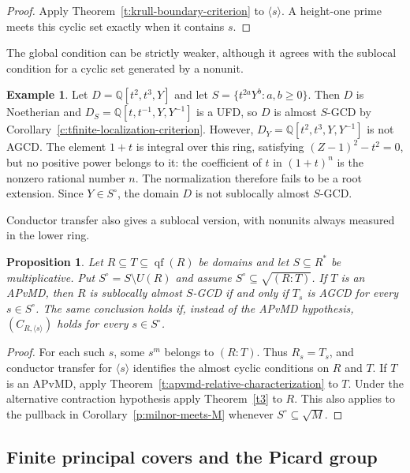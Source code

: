 \documentclass[11pt]{amsart}
\newtheorem{proposition}[theorem]{Proposition}
\theoremstyle{definition}
\newtheorem{example}[theorem]{Example}
\theoremstyle{remark}
\DeclareMathOperator{\qf}{qf}
\newcommand{\QQ}{\mathbb Q}
\begin{document}
\begin{proof}
Apply Theorem~\ref{t:krull-boundary-criterion} to
$\langle s\rangle$. A height-one prime meets this cyclic set
exactly when it contains $s$.
\end{proof}

The global condition can be strictly weaker, although it agrees
with the sublocal condition for a cyclic set generated by a nonunit.

\begin{example}\label{e:global-not-sublocal}
Let $D=\QQ[t^2,t^3,Y]$ and let
$S=\{t^{2a}Y^b:a,b\geq0\}$.
Then $D$ is Noetherian and
$D_S=\QQ[t,t^{-1},Y,Y^{-1}]$ is a UFD, so $D$ is almost
$S$-GCD by Corollary~\ref{c:tfinite-localization-criterion}.
However, $D_Y=\QQ[t^2,t^3,Y,Y^{-1}]$ is not AGCD.
The element $1+t$ is integral over this ring, satisfying
$(Z-1)^2-t^2=0$, but no positive power belongs to it: the
coefficient of $t$ in $(1+t)^n$ is the nonzero rational number
$n$. The normalization therefore fails to be a root extension.
Since $Y\in S^\circ$, the domain $D$ is not sublocally almost
$S$-GCD.
\end{example}

Conductor transfer also gives a sublocal version, with nonunits
always measured in the lower ring.

\begin{proposition}\label{p:sublocal-milnor-radical}
Let $R\subseteq T\subseteq\qf(R)$ be domains and let
$S\subseteq R^\ast$ be multiplicative. Put
$S^\circ=S\setminus U(R)$ and assume
$S^\circ\subseteq\sqrt{(R:T)}$.
If $T$ is an APvMD, then $R$ is sublocally almost $S$-GCD
if and only if $T_s$ is AGCD for every $s\in S^\circ$.
The same conclusion holds if, instead of the APvMD hypothesis,
$(C_{R,\langle s\rangle})$ holds for every $s\in S^\circ$.
\end{proposition}

\begin{proof}
For each such $s$, some $s^m$ belongs to $(R:T)$.
Thus $R_s=T_s$, and conductor transfer for $\langle s\rangle$
identifies the almost cyclic conditions on $R$ and $T$.
If $T$ is an APvMD, apply
Theorem~\ref{t:apvmd-relative-characterization} to $T$.
Under the alternative contraction hypothesis apply
Theorem~\ref{t3} to $R$.
This also applies to the pullback in
Corollary~\ref{p:milnor-meets-M} whenever
$S^\circ\subseteq\sqrt M$.
\end{proof}

\subsection{Finite principal covers and the Picard group}
\end{document}
